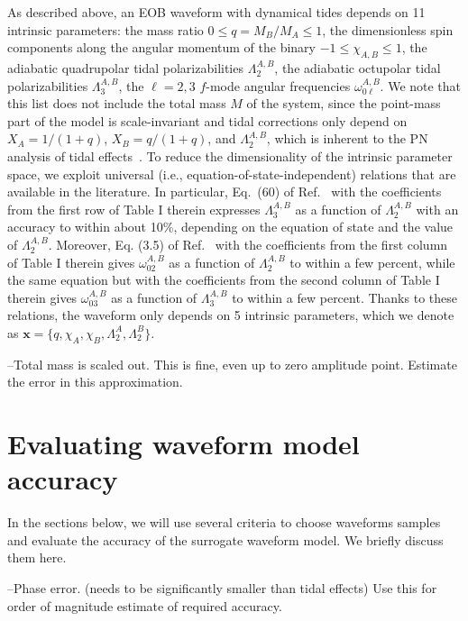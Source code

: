 \documentclass[prd,aps,letter,twocolumn,floatfix,notitlepage]{revtex4-1}
\begin{document}
As described above, an EOB waveform with dynamical tides depends on 11 intrinsic parameters: the mass ratio $0\leq q=M_B/M_A\leq1$, the dimensionless spin components along the angular momentum of the binary $-1 \leq \chi_{A,B} \leq1$, the adiabatic quadrupolar tidal polarizabilities $\Lambda_2^{A,B}$, the adiabatic octupolar tidal polarizabilities $\Lambda_3^{A,B}$, the $\ell=2,3$ $f$-mode angular frequencies $\omega_{0\ell}^{A,B}$. We note that this list does not include the total mass $M$ of the system, since the point-mass part of the model is scale-invariant and tidal corrections only depend on $X_A=1/(1+q)$, $X_B=q/(1+q)$, and $\Lambda_2^{A,B}$, which is inherent to the PN analysis of tidal effects~\cite{Flanagan:2007ix}. To reduce the dimensionality of the intrinsic parameter space, we exploit universal (i.e., equation-of-state-independent) relations that are available in the literature. In particular, Eq.~(60) of Ref.~\cite{Yagi:2013sva} with the coefficients from the first row of Table I therein expresses $\Lambda_3^{A,B}$ as a function of $\Lambda_2^{A,B}$ with an accuracy to within about 10\%, depending on the equation of state and the value of $\Lambda_2^{A,B}$. Moreover, Eq. (3.5) of Ref.~\cite{Chan:2014kua} with the coefficients from the first column of Table I therein gives $\omega_{02}^{A,B}$ as a function of $\Lambda_2^{A,B}$ to within a few percent, while the same equation but with the coefficients from the second column of Table I therein gives $\omega_{03}^{A,B}$ as a function of $\Lambda_3^{A,B}$ to within a few percent. Thanks to these relations, the waveform only depends on 5 intrinsic parameters, which we denote as $\boldsymbol{x}=\{q, \chi_A,\chi_B, \Lambda_2^A,\Lambda_2^B\}$. 

--Total mass is scaled out. This is fine, even up to zero amplitude point. Estimate the error in this approximation.


\section{Evaluating waveform model accuracy}

In the sections below, we will use several criteria to choose waveforms samples and evaluate the accuracy of the 
surrogate waveform model. We briefly discuss them here.

--Phase error. (needs to be significantly smaller than tidal effects) Use this for order of magnitude estimate of required
accuracy.
\end{document}
